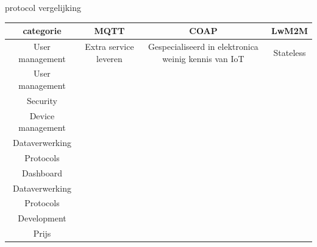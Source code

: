 \begin{frame}{protocol vergelijking}
	\begin{table}[htbp]
		\centering
		\begin{tabular}{|c|c|c|c|}\hline
			categorie&MQTT&COAP&LwM2M \cite{wikibooks} \cite{wikibooks} \\\hline
			
			
			User management	&\multicolumn{1}{m{2cm}|}{Extra service leveren }&\multicolumn{1}{m{4cm}|}{Gespecialiseerd in elektronica weinig kennis van IoT }&
			\multicolumn{1}{m{4cm}|}{ Stateless
			}\\\hline
			
			User management	&\multicolumn{1}{m{2cm}|}{  }&\multicolumn{1}{m{3cm}|}{  }&
			\multicolumn{1}{m{4cm}|}{ }\\\hline
			
			Security	&\multicolumn{1}{m{2cm}|}{  }&\multicolumn{1}{m{3cm}|}{  }&
			\multicolumn{1}{m{4cm}|}{ }\\\hline
			
			Device management	&\multicolumn{1}{m{2cm}|}{  }&\multicolumn{1}{m{3cm}|}{  }&
			\multicolumn{1}{m{4cm}|}{ }\\\hline
			
			Dataverwerking	&\multicolumn{1}{m{2cm}|}{  }&\multicolumn{1}{m{3cm}|}{  }&
			\multicolumn{1}{m{4cm}|}{ }\\\hline
			
			Protocols	&\multicolumn{1}{m{2cm}|}{  }&\multicolumn{1}{m{3cm}|}{  }&
			\multicolumn{1}{m{4cm}|}{ }\\\hline
			
			Dashboard	&\multicolumn{1}{m{2cm}|}{  }&\multicolumn{1}{m{3cm}|}{  }&
			\multicolumn{1}{m{4cm}|}{ }\\\hline
			
			Dataverwerking	&\multicolumn{1}{m{2cm}|}{  }&\multicolumn{1}{m{3cm}|}{  }&
			\multicolumn{1}{m{4cm}|}{ }\\\hline
			
			Protocols	&\multicolumn{1}{m{2cm}|}{  }&\multicolumn{1}{m{3cm}|}{  }&
			\multicolumn{1}{m{4cm}|}{ }\\\hline
			
			Development	&\multicolumn{1}{m{2cm}|}{  }&\multicolumn{1}{m{3cm}|}{  }&
			\multicolumn{1}{m{4cm}|}{ }\\\hline
			
			Prijs	&\multicolumn{1}{m{2cm}|}{  }&\multicolumn{1}{m{3cm}|}{  }&
			\multicolumn{1}{m{4cm}|}{ }\\\hline
		\end{tabular}
	\end{table}
	
\end{frame}




